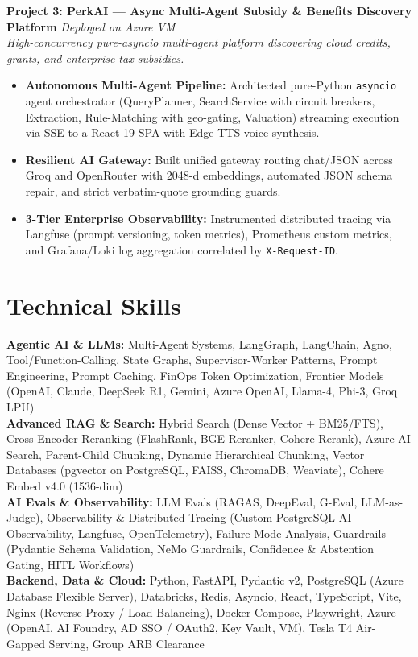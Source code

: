 \documentclass[a4paper,10pt]{article}
\begin{document}
\noindent
\textbf{\color{projecttitle}Project 3: PerkAI — Async Multi-Agent Subsidy \& Benefits Discovery Platform} \hfill \textit{\small Deployed on Azure VM} \\
\textit{\small High-concurrency pure-asyncio multi-agent platform discovering cloud credits, grants, and enterprise tax subsidies.}
\begin{itemize}
    \item \textbf{Autonomous Multi-Agent Pipeline:} Architected pure-Python \texttt{asyncio} agent orchestrator (QueryPlanner, SearchService with circuit breakers, Extraction, Rule-Matching with geo-gating, Valuation) streaming execution via SSE to a React 19 SPA with Edge-TTS voice synthesis.
    \item \textbf{Resilient AI Gateway:} Built unified gateway routing chat/JSON across Groq and OpenRouter with 2048-d embeddings, automated JSON schema repair, and strict verbatim-quote grounding guards.
    \item \textbf{3-Tier Enterprise Observability:} Instrumented distributed tracing via Langfuse (prompt versioning, token metrics), Prometheus custom metrics, and Grafana/Loki log aggregation correlated by \texttt{X-Request-ID}.
\end{itemize}

\section{Technical Skills}
\vspace{2pt}
\small
\textbf{Agentic AI \& LLMs:} Multi-Agent Systems, LangGraph, LangChain, Agno, Tool/Function-Calling, State Graphs, Supervisor-Worker Patterns, Prompt Engineering, Prompt Caching, FinOps Token Optimization, Frontier Models (OpenAI, Claude, DeepSeek R1, Gemini, Azure OpenAI, Llama-4, Phi-3, Groq LPU) \\[3.5pt]
\textbf{Advanced RAG \& Search:} Hybrid Search (Dense Vector + BM25/FTS), Cross-Encoder Reranking (FlashRank, BGE-Reranker, Cohere Rerank), Azure AI Search, Parent-Child Chunking, Dynamic Hierarchical Chunking, Vector Databases (pgvector on PostgreSQL, FAISS, ChromaDB, Weaviate), Cohere Embed v4.0 (1536-dim) \\[3.5pt]
\textbf{AI Evals \& Observability:} LLM Evals (RAGAS, DeepEval, G-Eval, LLM-as-Judge), Observability \& Distributed Tracing (Custom PostgreSQL AI Observability, Langfuse, OpenTelemetry), Failure Mode Analysis, Guardrails (Pydantic Schema Validation, NeMo Guardrails, Confidence \& Abstention Gating, HITL Workflows) \\[3.5pt]
\textbf{Backend, Data \& Cloud:} Python, FastAPI, Pydantic v2, PostgreSQL (Azure Database Flexible Server), Databricks, Redis, Asyncio, React, TypeScript, Vite, Nginx (Reverse Proxy / Load Balancing), Docker Compose, Playwright, Azure (OpenAI, AI Foundry, AD SSO / OAuth2, Key Vault, VM), Tesla T4 Air-Gapped Serving, Group ARB Clearance
\end{document}
